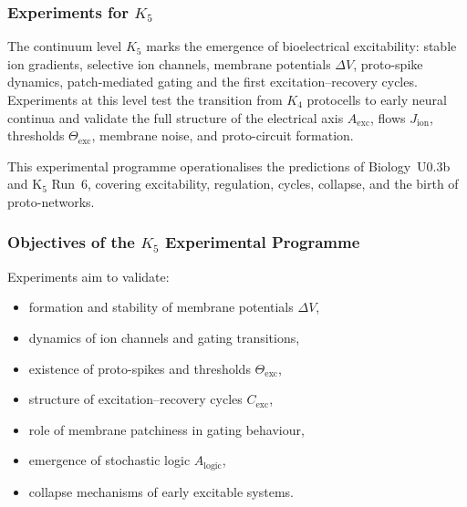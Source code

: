
\subsubsection{Experiments for \texorpdfstring{$K_5$}{K5}}
\label{sec:experiments-k5}

The continuum level $K_5$ marks the emergence of 
bioelectrical excitability: stable ion gradients, 
selective ion channels, membrane potentials $\Delta V$, 
proto-spike dynamics, patch-mediated gating and the 
first excitation--recovery cycles.  
Experiments at this level test the transition from $K_4$ protocells 
to early neural continua and validate the full structure of 
the electrical axis $A_{\mathrm{exc}}$, flows $J_{\mathrm{ion}}$, 
thresholds $\Theta_{\mathrm{exc}}$, membrane noise, 
and proto-circuit formation.

This experimental programme operationalises the predictions of 
Biology~U0.3b and K$_5$ Run~6, covering excitability, regulation, 
cycles, collapse, and the birth of proto-networks.



\subsubsection{Objectives of the \texorpdfstring{$K_5$}{K5} Experimental Programme}

Experiments aim to validate:

\begin{itemize}
    \item formation and stability of membrane potentials $\Delta V$,
    \item dynamics of ion channels and gating transitions,
    \item existence of proto-spikes and thresholds $\Theta_{\mathrm{exc}}$,
    \item structure of excitation--recovery cycles $C_{\mathrm{exc}}$,
    \item role of membrane patchiness in gating behaviour,
    \item emergence of stochastic logic $A_{\mathrm{logic}}$,
    \item collapse mechanisms of early excitable systems.
\end{itemize}




